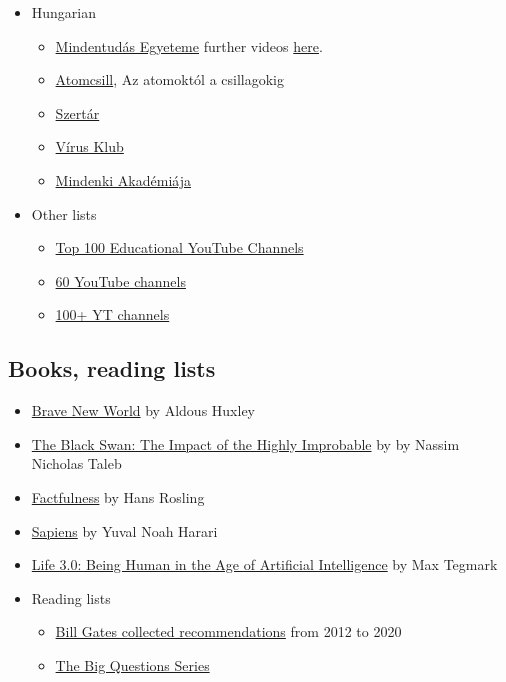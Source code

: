 \documentclass{article}
\begin{document}
\begin{itemize}
    \item Hungarian
    \begin{itemize}
        \item \href{https://mindentudas.hu/}{Mindentudás Egyeteme} further videos \href{https://mindentudas.videotorium.hu/hu/channels/1132/mindentudas-egyeteme}{here}.
        \item \href{http://www.atomcsill.elte.hu/}{Atomcsill}, Az atomoktól a csillagokig
        \item \href{http://szertar.com/}{Szertár}
        \item \href{https://www.virusklub.hu/}{Vírus Klub}
        \item \href{https://mediaklikk.hu/musor/mindenki-akademiaja/}{Mindenki Akadémiája}
    \end{itemize}

\item Other lists
\begin{itemize}
    \item \href{https://blog.feedspot.com/educational_youtube_channels/}{Top 100 Educational YouTube Channels}
    \item \href{https://medium.com/the-graph/60-youtube-channels-that-will-make-you-smarter-44d8315c2548}{60 YouTube channels}
    \item \href{https://collegeinfogeek.com/educational-youtube-channels/}{100+ YT channels}
\end{itemize}

\end{itemize}

\subsection{Books, reading lists}


\begin{itemize}

    \item \href{https://www.goodreads.com/book/show/5129.Brave_New_World}{Brave New World} by Aldous Huxley
    \item \href{https://www.goodreads.com/book/show/242472.The_Black_Swan}{The Black Swan: The Impact of the Highly Improbable} by by Nassim Nicholas Taleb 
    \item \href{https://www.goodreads.com/book/show/34890015-factfulness}{Factfulness} by Hans Rosling
    \item \href{https://www.goodreads.com/book/show/23692271-sapiens}{Sapiens} by Yuval Noah Harari
    \item \href{https://www.goodreads.com/book/show/34272565-life-3-0}{Life 3.0: Being Human in the Age of Artificial Intelligence} by Max Tegmark
    \item Reading lists
    \begin{itemize}
        \item \href{https://bookriot.com/bill-gates-book-recommendations/}{Bill Gates collected recommendations} from 2012 to 2020
        \item \href{https://www.goodreads.com/series/152497}{The Big Questions Series}
    \end{itemize}
\end{itemize}
\end{document}
